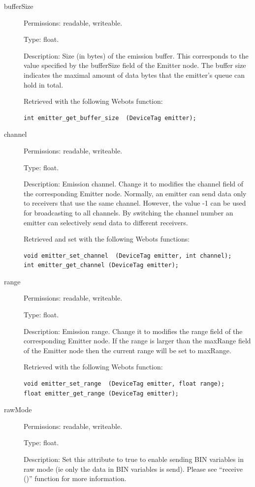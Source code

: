 \noindent
\begin{description}
\item[{         bufferSize
  }]            Permissions: readable, writeable.


  Type: float.


  Description: Size (in bytes) of the emission buffer. This
  corresponds to the value specified by the bufferSize field of the
  Emitter node. The buffer size indicates the maximal amount of data
  bytes that the emitter's queue can hold in total.


  Retrieved with the following Webots function:


\begin{lstlisting}
int emitter_get_buffer_size  (DeviceTag emitter);
\end{lstlisting}
\item[{         channel
  }]            Permissions: readable, writeable.


  Type: float.


  Description: Emission channel. Change it to modifies the channel
  field of the corresponding Emitter node. Normally, an emitter can
  send data only to receivers that use the same channel. However, the
  value -{}1 can be used for broadcasting to all channels. By
  switching the channel number an emitter can selectively send data to
  different receivers.


  Retrieved and set with the following Webots functions:


\begin{lstlisting}
void emitter_set_channel  (DeviceTag emitter, int channel);
int emitter_get_channel (DeviceTag emitter);
\end{lstlisting}
\item[{         range
 }]            Permissions: readable, writeable.


 Type: float.


 Description: Emission range. Change it to modifies the range field of
 the corresponding Emitter node. If the range is larger than the
 maxRange field of the Emitter node then the current range will be set
 to maxRange.


          Retrieved with the following Webots function:


\begin{lstlisting}
void emitter_set_range  (DeviceTag emitter, float range);
float emitter_get_range (DeviceTag emitter);
\end{lstlisting}
\item[{         rawMode
 }]            Permissions: readable, writeable.


 Type: float.


 Description: Set this attribute to true to enable sending BIN
 variables in raw mode (ie only the data in BIN variables is
 send). Please see ``receive ()'' function for more information.

\end{description}


